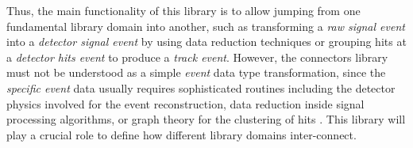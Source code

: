 Thus, the main functionality of this library is to allow jumping from one fundamental library domain into another, such as transforming a \emph{raw signal event} into a \emph{detector signal event} by using data reduction techniques or grouping hits at a \emph{detector hits event} to produce a \emph{track event}. However, the connectors library must not be understood as a simple \emph{event} data type transformation, since the \emph{specific event} data usually requires sophisticated routines including the detector physics involved for the event reconstruction, data reduction inside signal processing algorithms, or graph theory for the clustering of hits . This library will play a crucial role to define how different library domains inter-connect.



